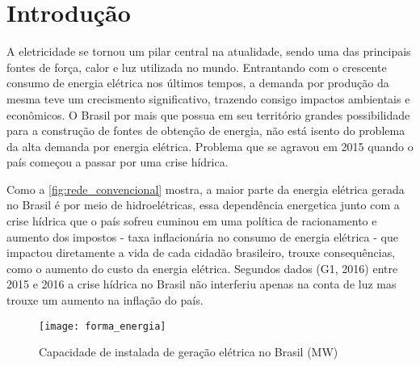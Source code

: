 \chapter[Introdução]{Introdução}
\label{ch:introdução}
A eletricidade se tornou um pilar central na atualidade, sendo uma das principais fontes de força, calor e luz utilizada no  mundo. Entrantando com o
crescente consumo de energia elétrica nos últimos tempos, a demanda por produção da mesma teve um crecismento significativo, trazendo consigo 
impactos ambientais e econômicos. O Brasil por mais que possua em seu território grandes possibilidade para a construção de fontes de obtenção de energia, não
está isento do problema da alta demanda por energia elétrica. Problema que se agravou em 2015 quando o país começou a passar por
uma crise hídrica.

Como a \autoref{fig:rede_convencional} mostra, a maior parte da energia elétrica gerada no Brasil é por meio de hidroelétricas, essa dependência
energetica junto com a crise hídrica que o país sofreu cuminou em uma política de racionamento e aumento dos impostos - taxa inflacionária no
consumo de energia elétrica - que impactou diretamente a vida de cada cidadão brasileiro, trouxe consequências, como o aumento do 
custo da energia elétrica. Segundos dados (G1, 2016) entre 2015 e 2016 a crise hídrica no Brasil não interferiu apenas na conta de luz mas trouxe
um aumento na inflação do país.




\begin{figure}[h!]
	\texttt{[image: forma\_energia]}
	\centering
	\caption[Capacidade de instalada de geração elétrica no Brasil (MW)]{Capacidade de instalada de geração elétrica no Brasil (MW)}
	\label{fig:rede_convencional}
\end{figure}
\FloatBarrier


